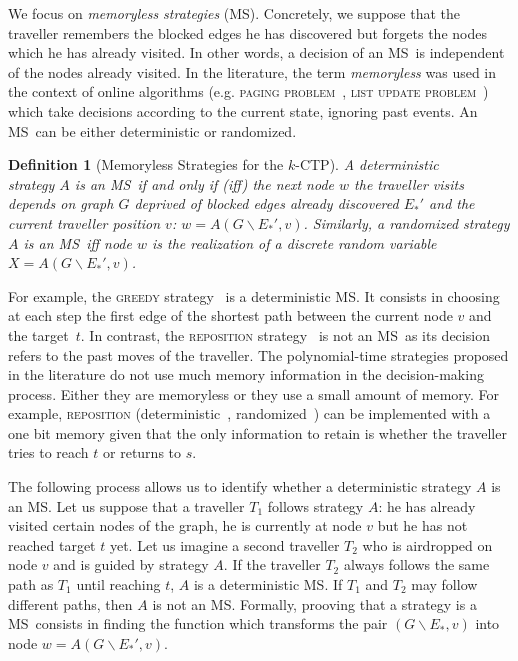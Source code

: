 \documentclass[preprint]{elsarticle}
\newtheorem{definition}{Definition}
\newcommand{\kctp}{$k$-CTP}
\newcommand{\mts}{MS}
\begin{document}
We focus on \textit{memoryless strategies} (\mts). Concretely, we suppose that the traveller remembers the blocked edges he has discovered but forgets the nodes which he has already visited. In other words, a decision of an \mts ~is independent of the nodes already visited. In the literature, the term \textit{memoryless} was used in the context of online algorithms (e.g. \textsc{paging problem}~\cite{BoEl98}, \textsc{list update problem}~\cite{Al03}) which take decisions according to the current state, ignoring past events. An \mts ~can be either deterministic or randomized.



\begin{definition}[Memoryless Strategies for the \kctp]
A deterministic \\strategy $A$ is an \mts ~if and only if (iff) the next node $w$ the traveller visits depends on graph $G$ deprived of blocked edges already discovered $E_*'$ and the current traveller position $v$: $w = A\left(G\backslash E_*',v\right)$. Similarly, a randomized strategy $A$ is an \mts ~iff node $w$ is the realization of a discrete random variable $X = A\left(G\backslash E_*',v\right)$.
\end{definition}


For example, the \textsc{greedy} strategy~\cite{XuHuSuZh09} is a deterministic \mts . It consists in choosing at each step the first edge of the shortest path between the current node $v$ and the target~$t$. 
In contrast, the \textsc{reposition} strategy~\cite{We08} is not an \mts ~as its decision refers to the past moves of the traveller. The polynomial-time strategies proposed in the literature do not use much memory information in the decision-making process. Either they are memoryless or they use a small amount of memory. For example, \textsc{reposition} (deterministic~\cite{We08}, randomized~\cite{BeWe15}) can be implemented with a  one bit memory given that the only information to retain is whether the traveller tries to reach $t$ or returns to $s$.

The following process allows us to identify whether a deterministic strategy $A$ is an \mts . Let us suppose that a traveller $T_1$ follows strategy $A$: he has already visited certain nodes of the graph, he is currently at node $v$ but he has not reached target $t$ yet. Let us imagine a second traveller $T_2$ who is airdropped on node $v$ and is guided by strategy $A$. If the traveller $T_2$ always follows the same path as $T_1$ until reaching $t$, $A$ is a deterministic \mts . If $T_1$ and $T_2$ may follow different paths, then $A$ is not an \mts . Formally, prooving that a strategy is a \mts ~consists in finding the function which transforms the pair $\left(G\backslash E_*,v\right)$ into node $w = A\left(G\backslash E_*',v\right)$.
\end{document}
